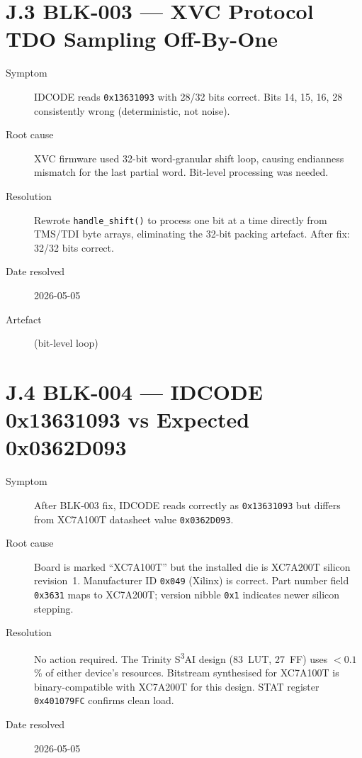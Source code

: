\section*{J.3 BLK-003 --- XVC Protocol TDO Sampling Off-By-One}
\label{sec:appJ-blk003}

\begin{description}
  \item[Symptom] IDCODE reads \texttt{0x13631093} with 28/32 bits correct.
    Bits 14, 15, 16, 28 consistently wrong (deterministic, not noise).
  \item[Root cause] XVC firmware used 32-bit word-granular shift loop,
    causing endianness mismatch for the last partial word. Bit-level
    processing was needed.
  \item[Resolution] Rewrote \texttt{handle\_shift()} to process one bit at a
    time directly from TMS/TDI byte arrays, eliminating the 32-bit packing
    artefact. After fix: 32/32 bits correct.
  \item[Date resolved] 2026-05-05
  \item[Artefact]  (bit-level loop)
\end{description}

\section*{J.4 BLK-004 --- IDCODE 0x13631093 vs Expected 0x0362D093}
\label{sec:appJ-blk004}

\begin{description}
  \item[Symptom] After BLK-003 fix, IDCODE reads correctly as
    \texttt{0x13631093} but differs from XC7A100T datasheet value
    \texttt{0x0362D093}.
  \item[Root cause] Board is marked ``XC7A100T'' but the installed die is
    XC7A200T silicon revision~1. Manufacturer ID \texttt{0x049} (Xilinx)
    is correct. Part number field \texttt{0x3631} maps to XC7A200T; version
    nibble \texttt{0x1} indicates newer silicon stepping.
  \item[Resolution] No action required. The Trinity S\textsuperscript{3}AI
    design (83~LUT, 27~FF) uses $< 0.1$\% of either device's resources.
    Bitstream synthesised for XC7A100T is binary-compatible with XC7A200T
    for this design. STAT register \texttt{0x401079FC} confirms clean load.
  \item[Date resolved] 2026-05-05
\end{description}

